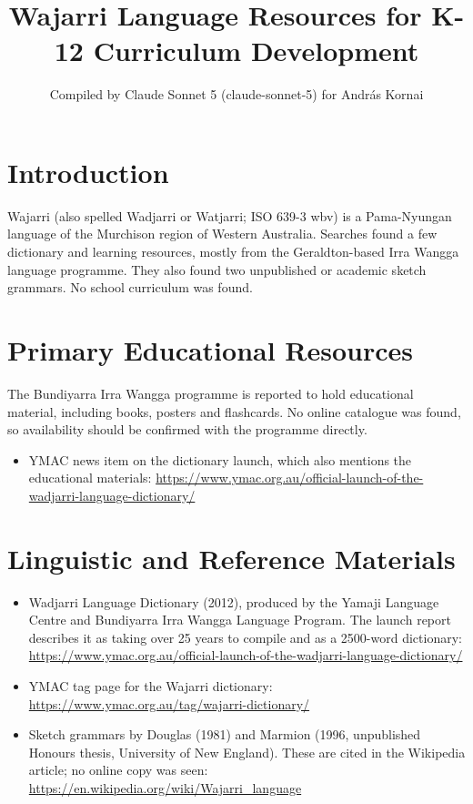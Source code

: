 \documentclass[12pt]{article}
\title{Wajarri Language Resources for K-12 Curriculum Development}
\author{Compiled by Claude Sonnet 5 (claude-sonnet-5) for Andr\'as Kornai}
\date{}
\begin{document}
\maketitle

\section{Introduction}
Wajarri (also spelled Wadjarri or Watjarri; ISO 639-3 wbv) is a Pama-Nyungan language of the Murchison region of Western Australia. Searches found a few dictionary and learning resources, mostly from the Geraldton-based Irra Wangga language programme. They also found two unpublished or academic sketch grammars. No school curriculum was found.

\section{Primary Educational Resources}
The Bundiyarra Irra Wangga programme is reported to hold educational material, including books, posters and flashcards. No online catalogue was found, so availability should be confirmed with the programme directly.
\begin{itemize}
\item YMAC news item on the dictionary launch, which also mentions the educational materials: \url{https://www.ymac.org.au/official-launch-of-the-wadjarri-language-dictionary/}
\end{itemize}

\section{Linguistic and Reference Materials}
\begin{itemize}
\item Wadjarri Language Dictionary (2012), produced by the Yamaji Language Centre and Bundiyarra Irra Wangga Language Program. The launch report describes it as taking over 25 years to compile and as a 2500-word dictionary: \url{https://www.ymac.org.au/official-launch-of-the-wadjarri-language-dictionary/}
\item YMAC tag page for the Wajarri dictionary: \url{https://www.ymac.org.au/tag/wajarri-dictionary/}
\item Sketch grammars by Douglas (1981) and Marmion (1996, unpublished Honours thesis, University of New England). These are cited in the Wikipedia article; no online copy was seen: \url{https://en.wikipedia.org/wiki/Wajarri_language}
\end{itemize}
\end{document}
